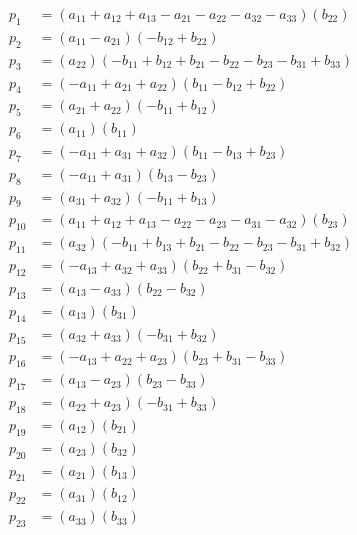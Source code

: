 {\small
\begin{align*}
p_{1}&=(a_{11}+a_{12}+a_{13}-a_{21}-a_{22}-a_{32}-a_{33})(b_{22})\\
p_{2}&=(a_{11}-a_{21})(-b_{12}+b_{22})\\
p_{3}&=(a_{22})(-b_{11}+b_{12}+b_{21}-b_{22}-b_{23}-b_{31}+b_{33})\\
p_{4}&=(-a_{11}+a_{21}+a_{22})(b_{11}-b_{12}+b_{22})\\
p_{5}&=(a_{21}+a_{22})(-b_{11}+b_{12})\\
p_{6}&=(a_{11})(b_{11})\\
p_{7}&=(-a_{11}+a_{31}+a_{32})(b_{11}-b_{13}+b_{23})\\
p_{8}&=(-a_{11}+a_{31})(b_{13}-b_{23})\\
p_{9}&=(a_{31}+a_{32})(-b_{11}+b_{13})\\
p_{10}&=(a_{11}+a_{12}+a_{13}-a_{22}-a_{23}-a_{31}-a_{32})(b_{23})\\
p_{11}&=(a_{32})(-b_{11}+b_{13}+b_{21}-b_{22}-b_{23}-b_{31}+b_{32})\\
p_{12}&=(-a_{13}+a_{32}+a_{33})(b_{22}+b_{31}-b_{32})\\
p_{13}&=(a_{13}-a_{33})(b_{22}-b_{32})\\
p_{14}&=(a_{13})(b_{31})\\
p_{15}&=(a_{32}+a_{33})(-b_{31}+b_{32})\\
p_{16}&=(-a_{13}+a_{22}+a_{23})(b_{23}+b_{31}-b_{33})\\
p_{17}&=(a_{13}-a_{23})(b_{23}-b_{33})\\
p_{18}&=(a_{22}+a_{23})(-b_{31}+b_{33})\\
p_{19}&=(a_{12})(b_{21})\\
p_{20}&=(a_{23})(b_{32})\\
p_{21}&=(a_{21})(b_{13})\\
p_{22}&=(a_{31})(b_{12})\\
p_{23}&=(a_{33})(b_{33})
\end{align*}
}
